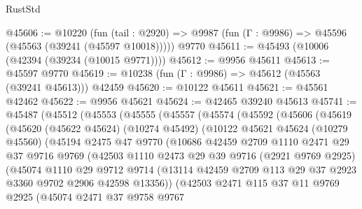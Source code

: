\begin{lexlean}{RustStd}
\begin{coremodule}
@45606 := @10220
    (fun (tail : @2920) => @9987 (fun (Γ : @9986) => @45596 (@45563 (@39241 (@45597 @10018)))))
    @9770
@45611 := @45493 (@10006 (@42394 (@39234 (@10015 @9771))))
@45612 := @9956 @45611
@45613 := @45597 @9770
@45619 := @10238 (fun (Γ : @9986) => @45612 (@45563 (@39241 @45613))) @42459
@45620 := @10122 @45611
@45621 := @45561 @42462
@45622 := @9956 @45621
@45624 := @42465 @39240 @45613
@45741 := @45487
    (@45512
      (@45553
        (@45555
          (@45557
            (@45574
              (@45592
                (@45606
                  (@45619
                    (@45620
                      (@45622 @45624)
                      (@10274 @45492)
                      (@10122
                        @45621
                        @45624
                        (@10279 @45560)
                        (@45194
                          @2475
                          @47
                          @9770
                          (@10686
                            @42459
                            @2709
                            @1110
                            @2471
                            @29
                            @37
                            @9716
                            @9769
                            (@42503
                              @1110
                              @2473
                              @29
                              @39
                              @9716
                              (@2921 @9769 @2925)
                              (@45074
                                @1110
                                @29
                                @9712
                                @9714
                                (@13114
                                  @42459
                                  @2709
                                  @113
                                  @29
                                  @37
                                  @2923
                                  @3360
                                  @9702
                                  @2906
                                  @42598
                                  @13356))
                              (@42503
                                @2471
                                @115
                                @37
                                @11
                                @9769
                                @2925
                                (@45074
                                  @2471
                                  @37
                                  @9758
                                  @9767

\end{coremodule}
\end{lexlean}
